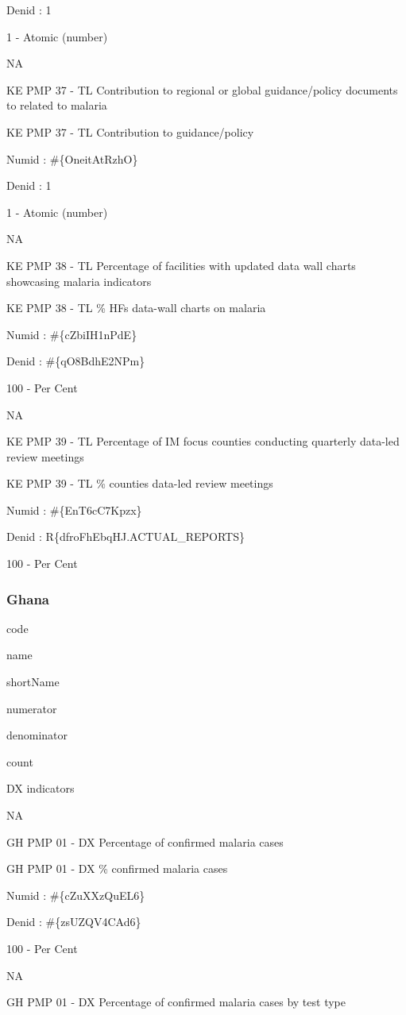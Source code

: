 \documentclass[]{book}
\begin{document}
Denid : 1

1 - Atomic (number)

NA

KE PMP 37 - TL Contribution to regional or global guidance/policy documents to related to malaria

KE PMP 37 - TL Contribution to guidance/policy

Numid : \#\{OneitAtRzhO\}

Denid : 1

1 - Atomic (number)

NA

KE PMP 38 - TL Percentage of facilities with updated data wall charts showcasing malaria indicators

KE PMP 38 - TL \% HFs data-wall charts on malaria

Numid : \#\{cZbiIH1nPdE\}

Denid : \#\{qO8BdhE2NPm\}

100 - Per Cent

NA

KE PMP 39 - TL Percentage of IM focus counties conducting quarterly data-led review meetings

KE PMP 39 - TL \% counties data-led review meetings

Numid : \#\{EnT6cC7Kpzx\}

Denid : R\{dfroFhEbqHJ.ACTUAL\_REPORTS\}

100 - Per Cent

\hypertarget{ghana}{%
\subsubsection{Ghana}\label{ghana}}

code

name

shortName

numerator

denominator

count

DX indicators

NA

GH PMP 01 - DX Percentage of confirmed malaria cases

GH PMP 01 - DX \% confirmed malaria cases

Numid : \#\{cZuXXzQuEL6\}

Denid : \#\{zsUZQV4CAd6\}

100 - Per Cent

NA

GH PMP 01 - DX Percentage of confirmed malaria cases by test type
\end{document}
